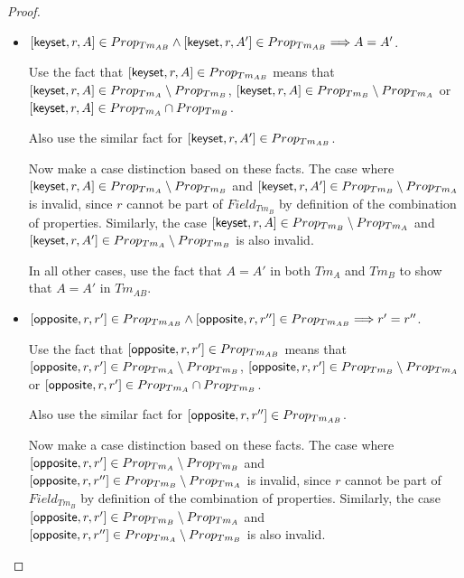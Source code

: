 \begin{proof}
\begin{itemize}
    Finally, if $c1 \neq c2$, the proof is given by assumption.
    
    
    \item $[ \mathsf{keyset}, r, A ] \in Prop_{Tm_{AB}} \land [ \mathsf{keyset}, r, A' ] \in Prop_{Tm_{AB}} \Longrightarrow A = A'$.
    
    Use the fact that $[ \mathsf{keyset}, r, A ] \in Prop_{Tm_{AB}}$ means that $[ \mathsf{keyset}, r, A ] \in Prop_{Tm_{A}} \setminus Prop_{Tm_{B}}$, $[ \mathsf{keyset}, r, A ] \in Prop_{Tm_{B}} \setminus Prop_{Tm_{A}}$ or $[ \mathsf{keyset}, r, A ] \in Prop_{Tm_{A}} \cap Prop_{Tm_{B}}$.
    
    Also use the similar fact for $[ \mathsf{keyset}, r, A' ] \in Prop_{Tm_{AB}}$.
    
    Now make a case distinction based on these facts. The case where $[ \mathsf{keyset}, r, A ] \in Prop_{Tm_{A}} \setminus Prop_{Tm_{B}}$ and $[ \mathsf{keyset}, r, A' ] \in Prop_{Tm_{B}} \setminus Prop_{Tm_{A}}$ is invalid, since $r$ cannot be part of $Field_{Tm_B}$ by definition of the combination of properties. Similarly, the case $[ \mathsf{keyset}, r, A ] \in Prop_{Tm_{B}} \setminus Prop_{Tm_{A}}$ and $[ \mathsf{keyset}, r, A' ] \in Prop_{Tm_{A}} \setminus Prop_{Tm_{B}}$ is also invalid.
    
    In all other cases, use the fact that $A = A'$ in both $Tm_{A}$ and $Tm_{B}$ to show that $A = A'$ in $Tm_{AB}$.
    
    
    \item $[ \mathsf{opposite}, r, r' ] \in Prop_{Tm_{AB}} \land [ \mathsf{opposite}, r, r'' ] \in Prop_{Tm_{AB}} \Longrightarrow r' = r''$.
    
    Use the fact that $[ \mathsf{opposite}, r, r' ] \in Prop_{Tm_{AB}}$ means that $[ \mathsf{opposite}, r, r' ] \in Prop_{Tm_{A}} \setminus Prop_{Tm_{B}}$, $[ \mathsf{opposite}, r, r' ] \in Prop_{Tm_{B}} \setminus Prop_{Tm_{A}}$ or $[ \mathsf{opposite}, r, r' ] \in Prop_{Tm_{A}} \cap Prop_{Tm_{B}}$.
    
    Also use the similar fact for $[ \mathsf{opposite}, r, r'' ] \in Prop_{Tm_{AB}}$.
    
    Now make a case distinction based on these facts. The case where $[ \mathsf{opposite}, r, r' ] \in Prop_{Tm_{A}} \setminus Prop_{Tm_{B}}$ and $[ \mathsf{opposite}, r, r'' ] \in Prop_{Tm_{B}} \setminus Prop_{Tm_{A}}$ is invalid, since $r$ cannot be part of $Field_{Tm_B}$ by definition of the combination of properties. Similarly, the case $[ \mathsf{opposite}, r, r' ] \in Prop_{Tm_{B}} \setminus Prop_{Tm_{A}}$ and $[ \mathsf{opposite}, r, r'' ] \in Prop_{Tm_{A}} \setminus Prop_{Tm_{B}}$ is also invalid.
    

\end{itemize}
\end{proof}
